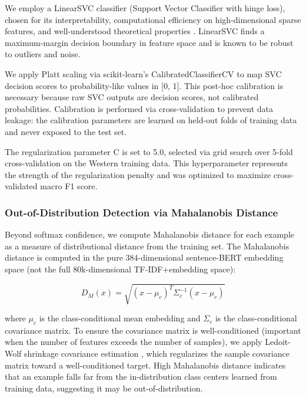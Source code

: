 \documentclass{article}
\begin{document}
We employ a LinearSVC classifier (Support Vector Classifier with hinge loss), chosen for its interpretability, computational efficiency on high-dimensional sparse features, and well-understood theoretical properties \citep{cortes1995}. LinearSVC finds a maximum-margin decision boundary in feature space and is known to be robust to outliers and noise.

We apply Platt scaling \citep{platt1999} via scikit-learn's CalibratedClassifierCV to map SVC decision scores to probability-like values in [0, 1]. This post-hoc calibration is necessary because raw SVC outputs are decision scores, not calibrated probabilities. Calibration is performed via cross-validation to prevent data leakage: the calibration parameters are learned on held-out folds of training data and never exposed to the test set.

The regularization parameter C is set to 5.0, selected via grid search over 5-fold cross-validation on the Western training data. This hyperparameter represents the strength of the regularization penalty and was optimized to maximize cross-validated macro F1 score.

\subsubsection{Out-of-Distribution Detection via Mahalanobis Distance}

Beyond softmax confidence, we compute Mahalanobis distance \citep{lee2018} for each example as a measure of distributional distance from the training set. The Mahalanobis distance is computed in the pure 384-dimensional sentence-BERT embedding space (not the full 80k-dimensional TF-IDF+embedding space):

\begin{equation}
D_M(x) = \sqrt{(x - \mu_c)^T \Sigma_c^{-1} (x - \mu_c)}
\end{equation}

where $\mu_c$ is the class-conditional mean embedding and $\Sigma_c$ is the class-conditional covariance matrix. To ensure the covariance matrix is well-conditioned (important when the number of features exceeds the number of samples), we apply Ledoit-Wolf shrinkage covariance estimation \citep{ledoit2004}, which regularizes the sample covariance matrix toward a well-conditioned target. High Mahalanobis distance indicates that an example falls far from the in-distribution class centers learned from training data, suggesting it may be out-of-distribution.
\end{document}
